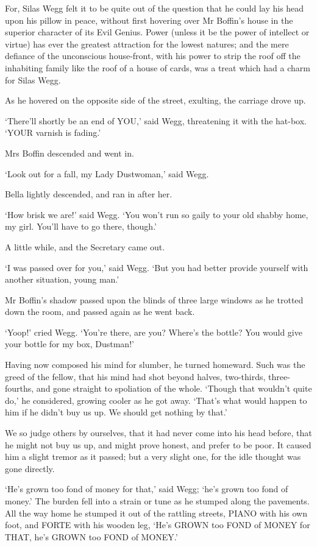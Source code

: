 For, Silas Wegg felt it to be quite out of the question that he could
lay his head upon his pillow in peace, without first hovering over
Mr Boffin’s house in the superior character of its Evil Genius. Power
(unless it be the power of intellect or virtue) has ever the greatest
attraction for the lowest natures; and the mere defiance of the
unconscious house-front, with his power to strip the roof off the
inhabiting family like the roof of a house of cards, was a treat which
had a charm for Silas Wegg.

As he hovered on the opposite side of the street, exulting, the carriage
drove up.

‘There’ll shortly be an end of YOU,’ said Wegg, threatening it with the
hat-box. ‘YOUR varnish is fading.’

Mrs Boffin descended and went in.

‘Look out for a fall, my Lady Dustwoman,’ said Wegg.

Bella lightly descended, and ran in after her.

‘How brisk we are!’ said Wegg. ‘You won’t run so gaily to your old
shabby home, my girl. You’ll have to go there, though.’

A little while, and the Secretary came out.

‘I was passed over for you,’ said Wegg. ‘But you had better provide
yourself with another situation, young man.’

Mr Boffin’s shadow passed upon the blinds of three large windows as he
trotted down the room, and passed again as he went back.

‘Yoop!’ cried Wegg. ‘You’re there, are you? Where’s the bottle? You
would give your bottle for my box, Dustman!’

Having now composed his mind for slumber, he turned homeward. Such
was the greed of the fellow, that his mind had shot beyond halves,
two-thirds, three-fourths, and gone straight to spoliation of the whole.
‘Though that wouldn’t quite do,’ he considered, growing cooler as he got
away. ‘That’s what would happen to him if he didn’t buy us up. We should
get nothing by that.’

We so judge others by ourselves, that it had never come into his head
before, that he might not buy us up, and might prove honest, and prefer
to be poor. It caused him a slight tremor as it passed; but a very
slight one, for the idle thought was gone directly.

‘He’s grown too fond of money for that,’ said Wegg; ‘he’s grown too fond
of money.’ The burden fell into a strain or tune as he stumped along the
pavements. All the way home he stumped it out of the rattling streets,
PIANO with his own foot, and FORTE with his wooden leg, ‘He’s GROWN too
FOND of MONEY for THAT, he’s GROWN too FOND of MONEY.’

